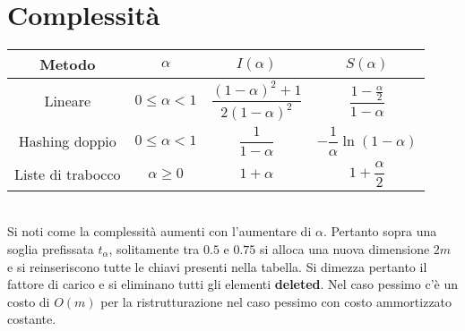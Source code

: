 \section{Complessit\`a}
\begin{tabular}{c c c c}
\hline
\textbf{Metodo} & $\alpha$ & $I(\alpha)$ & $S(\alpha)$\\
\hline
Lineare & $0\le\alpha< 1$ & $\dfrac{(1-\alpha)^2+1}{2(1-\alpha)^2}$ & $\dfrac{1-\frac{\alpha}{2}}{1-\alpha}$\\
Hashing doppio & $0\le\alpha< 1$ & $\dfrac{1}{1-\alpha}$ & $-\dfrac{1}{\alpha}\ln(1-\alpha)$\\
Liste di trabocco & $\alpha\ge 0$ & $1+\alpha$ & $1+\dfrac{\alpha}{2}$\\
\hline
\end{tabular}\\
Si noti come la complessit\`a aumenti con l'aumentare di $\alpha$. Pertanto sopra una soglia prefissata $t_\alpha$, solitamente tra $0.5$ e $0.75$ si alloca
una nuova dimensione $2m$ e si reinseriscono tutte le chiavi presenti nella tabella. Si dimezza pertanto il fattore di carico e si eliminano tutti gli 
elementi \textbf{deleted}. Nel caso pessimo c'\`e un costo di $O(m)$ per la ristrutturazione nel caso pessimo con costo ammortizzato costante. 